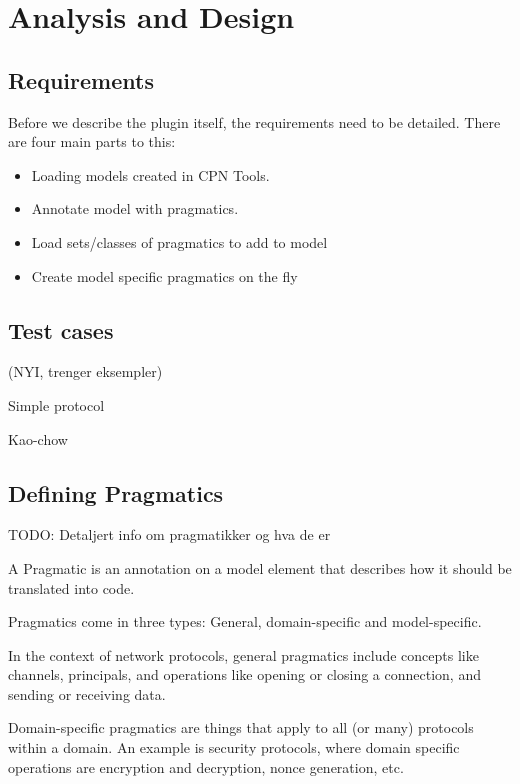 \chapter{Analysis and Design}
\label{chap:analysis}

\section{Requirements} 
Before we describe the plugin itself, the requirements need to be detailed.
There are four main parts to this:

\begin{itemize}
	\item Loading models created in CPN Tools.

	\item Annotate model with pragmatics. 
		
	\item Load sets/classes of pragmatics to add to model
	
	\item Create model specific pragmatics on the fly

\end{itemize}

\section{Test cases}

(NYI, trenger eksempler)

Simple protocol

Kao-chow


\section{Defining Pragmatics}
TODO: Detaljert info om pragmatikker og hva de er

A Pragmatic is an annotation on a model element that describes how it should be
translated into code.

Pragmatics come in three types: General, domain-specific and model-specific.

In the context of network protocols, general pragmatics include concepts
like channels, principals, and operations like opening or closing a connection,
and sending or receiving data. 

Domain-specific pragmatics are things that apply to all (or many) protocols
within a domain. An example is security protocols, where domain specific
operations are encryption and decryption, nonce generation, etc.


